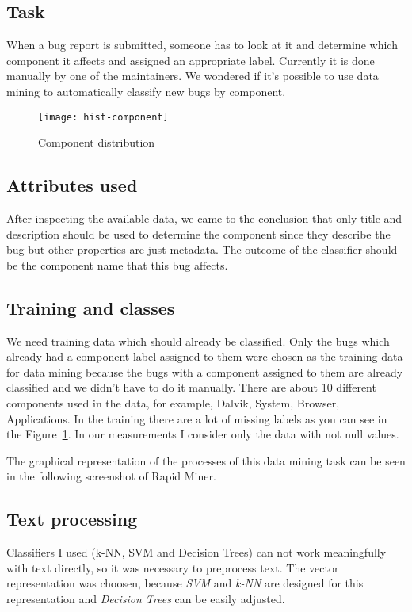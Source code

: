 
\subsection*{Task} %
\label{sub:Task}
When a bug report is submitted, someone has to look at it and determine which component it affects and assigned an appropriate label. Currently it is done manually by one of the maintainers. We wondered if it's possible to use data mining to automatically classify new bugs by component.

\begin{figure}[!htp]
\begin{center} 
\texttt{[image: hist-component]}
\caption{\label{fig:component}Component distribution}
\end{center}
\end{figure}

\subsection*{Attributes used} %
\label{sub:Attributes used}
After inspecting the available data, we came to the conclusion that only title and description should be used to determine the component since they describe the bug but other properties are just metadata. The outcome of the classifier should be the component name that this bug affects.

\subsection*{Training and classes} %
\label{sub:Training and classes}
We need training data which should already be classified. Only the bugs which already had a component label assigned to them were chosen as the training data for data mining because the bugs with a component assigned to them are already classified and we didn't have to do it manually. There are about 10 different components used in the data, for example, Dalvik, System, Browser, Applications.
In the training there are a lot of missing labels as you can see in the  Figure~\ref{fig:component}. In our measurements I consider only the data with not null values.

The graphical representation of the processes of this data mining task can be seen in the following screenshot of Rapid Miner.


\subsection*{Text processing} %
\label{sub:Text processing}
Classifiers I used (k-NN, SVM and Decision Trees) can not work meaningfully with text directly, so it was necessary to preprocess text. The vector representation was choosen, because {\it SVM} and {\it k-NN} are designed for this representation and {\it Decision Trees} can be easily adjusted.

